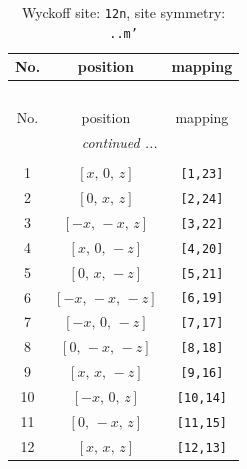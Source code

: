 \documentclass[fleqn,8pt]{jsarticle}
\begin{document}
\begin{longtable}{ccc}
\caption{Wyckoff site: {\tt 12n}, site symmetry: {\tt ..m'}}
 \\
 \hline \hline
No. & position & mapping \\ \hline \endfirsthead

\multicolumn{2}{l}{\tablename\ \thetable{}} \\
 \hline \hline
No. & position & mapping \\ \hline \endhead

 \hline \hline
\multicolumn{2}{r}{\footnotesize\it continued ...} \\ \endfoot

 \hline \hline
\multicolumn{2}{r}{} \\ \endlastfoot

1 & $\left[ x,\, 0,\, z \right]$ & {\tt [1,23]} \\ \hline
2 & $\left[ 0,\, x,\, z \right]$ & {\tt [2,24]} \\ \hline
3 & $\left[ - x,\, - x,\, z \right]$ & {\tt [3,22]} \\ \hline
4 & $\left[ x,\, 0,\, - z \right]$ & {\tt [4,20]} \\ \hline
5 & $\left[ 0,\, x,\, - z \right]$ & {\tt [5,21]} \\ \hline
6 & $\left[ - x,\, - x,\, - z \right]$ & {\tt [6,19]} \\ \hline
7 & $\left[ - x,\, 0,\, - z \right]$ & {\tt [7,17]} \\ \hline
8 & $\left[ 0,\, - x,\, - z \right]$ & {\tt [8,18]} \\ \hline
9 & $\left[ x,\, x,\, - z \right]$ & {\tt [9,16]} \\ \hline
10 & $\left[ - x,\, 0,\, z \right]$ & {\tt [10,14]} \\ \hline
11 & $\left[ 0,\, - x,\, z \right]$ & {\tt [11,15]} \\ \hline
12 & $\left[ x,\, x,\, z \right]$ & {\tt [12,13]} \\
\end{longtable}
\renewcommand{\arraystretch}{1.2}
\end{document}
